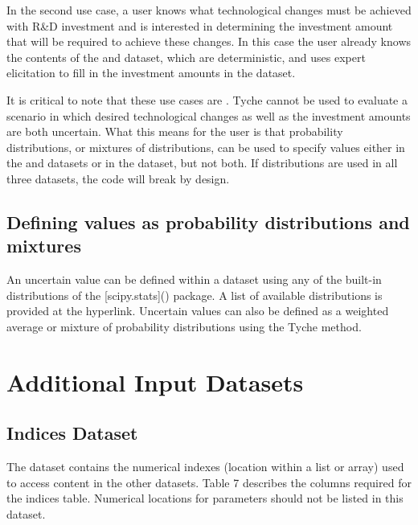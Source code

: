 \documentclass[letterpaper,10pt,english]{sphinxmanual}
\begin{document}
In the second use case, a user knows what technological changes must be achieved with R\&D investment and is interested in determining the investment amount that will be required to achieve these changes. In this case the user already knows the contents of the  and  dataset, which are deterministic, and uses expert elicitation to fill in the investment amounts in the  dataset.

It is critical to note that these use cases are . Tyche cannot be used to evaluate a scenario in which desired technological changes as well as the investment amounts are both uncertain. What this means for the user is that probability distributions, or mixtures of distributions, can be used to specify values either in the  and  datasets or in the  dataset, but not both. If distributions are used in all three datasets, the code will break by design.


\subsection{Defining values as probability distributions and mixtures}
\label{\detokenize{cheat-sheet:defining-values-as-probability-distributions-and-mixtures}}
An uncertain value can be defined within a dataset using any of the built-in distributions of the {[}scipy.stats{]}() package. A list of available distributions is provided at the hyperlink. Uncertain values can also be defined as a weighted average or mixture of probability distributions using the Tyche  method.


\section{Additional Input Datasets}
\label{\detokenize{cheat-sheet:additional-input-datasets}}

\subsection{Indices Dataset}
\label{\detokenize{cheat-sheet:indices-dataset}}
The  dataset contains the numerical indexes (location within a list or array) used to access content in the other datasets. Table 7 describes the columns required for the indices table. Numerical locations for parameters should not be listed in this dataset.
\end{document}
